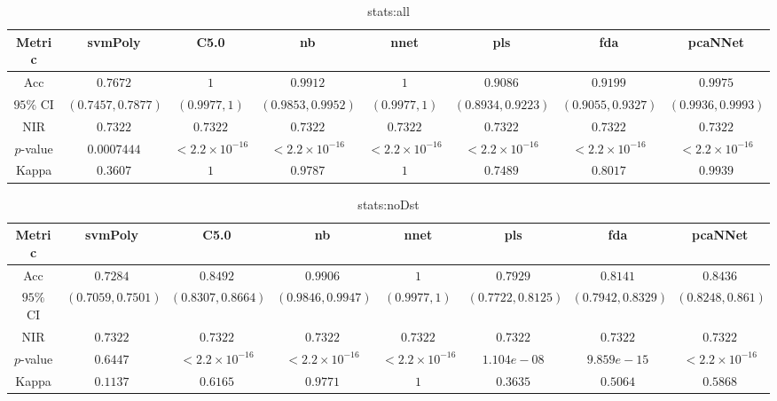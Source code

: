 \begin{table}[!ht]
	\centering
	\begin{tabular}{|c|c|c|c|c|c|c|c|}
		\hline
		Metric & svmPoly & C5.0 & nb & nnet & pls & fda & pcaNNet \\ \hline
		Acc & $0.7672$ & $1$ & $0.9912$ & $1$ & $0.9086$ & $0.9199$ & $0.9975$ \\ \hline
		$95\%$ CI & $(0.7457, 0.7877)$ & $(0.9977, 1)$ & $(0.9853, 0.9952)$ & $(0.9977, 1)$ & $(0.8934, 0.9223)$ & $(0.9055, 0.9327)$ & $(0.9936, 0.9993)$ \\ \hline
		NIR & $0.7322$ & $0.7322$ & $0.7322$ & $0.7322$ & $0.7322$ & $0.7322$ & $0.7322$ \\ \hline
		$p$-value & $0.0007444$ & $< 2.2 \times {10}^{-16}$ & $< 2.2 \times {10}^{-16}$ & $< 2.2 \times {10}^{-16}$ & $< 2.2 \times {10}^{-16}$ & $< 2.2 \times {10}^{-16}$ & $< 2.2 \times {10}^{-16}$ \\ \hline
		Kappa & $0.3607$ & $1$ & $0.9787$ & $1$ & $0.7489$ & $0.8017$ & $0.9939$ \\ \hline
	\end{tabular}
	\caption{stats:all}
	\label{tab:stats:all}
\end{table}

\begin{table}[!ht]
	\centering
	\begin{tabular}{|c|c|c|c|c|c|c|c|}
		\hline
		Metric & svmPoly & C5.0 & nb & nnet & pls & fda & pcaNNet \\ \hline
		Acc & $0.7284$ & $0.8492$ & $0.9906$ & $1$ & $0.7929$ & $0.8141$ & $0.8436$ \\ \hline
		$95\%$ CI & $(0.7059, 0.7501)$ & $(0.8307, 0.8664)$ & $(0.9846, 0.9947)$ & $(0.9977, 1)$ & $(0.7722, 0.8125)$ & $(0.7942, 0.8329)$ & $(0.8248, 0.861)$ \\ \hline
		NIR & $0.7322$ & $0.7322$ & $0.7322$ & $0.7322$ & $0.7322$ & $0.7322$ & $0.7322$ \\ \hline
		$p$-value & $0.6447$ & $< 2.2 \times {10}^{-16}$ & $< 2.2 \times {10}^{-16}$ & $< 2.2 \times {10}^{-16}$ & $1.104e-08$ & $9.859e-15$ & $< 2.2 \times {10}^{-16}$ \\ \hline
		Kappa & $0.1137$ & $0.6165$ & $0.9771$ & $1$ & $0.3635$ & $0.5064$ & $0.5868$ \\ \hline
	\end{tabular}
	\caption{stats:noDst}
	\label{tab:stats:noDst}
\end{table}

